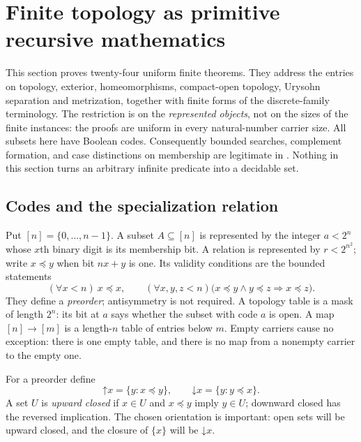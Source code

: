 \section{Finite topology as primitive recursive mathematics}\label{sec:finite}

This section proves twenty-four uniform finite theorems.  They address the
entries on topology, exterior, homeomorphisms, compact-open topology,
Urysohn separation and metrization, together with finite forms of the
discrete-family terminology.  The restriction is on the \emph{represented
objects}, not on the sizes of the finite instances: the proofs are uniform
in every natural-number carrier size.  All subsets here have Boolean
codes.  Consequently bounded searches, complement formation, and
case distinctions on membership are legitimate in \ipra.  Nothing in
this section turns an arbitrary infinite predicate into a decidable set.

\subsection{Codes and the specialization relation}

Put $[n]=\{0,\ldots,n-1\}$.  A subset $A\subseteq[n]$ is represented by
the integer $a<2^n$ whose $x$th binary digit is its membership bit.  A
relation is represented by $r<2^{n^2}$; write $x\preceq y$ when bit
$nx+y$ is one.  Its validity conditions are the bounded statements
\[
 (\forall x<n)\ x\preceq x,\qquad
 (\forall x,y,z<n)\bigl(x\preceq y\land y\preceq z
                         \Rightarrow x\preceq z\bigr).
\]
They define a \emph{preorder}; antisymmetry is not required.  A topology
table is a mask of length $2^n$: its bit at $a$ says whether the subset
with code $a$ is open.  A map $[n]\to[m]$ is a length-$n$ table of
entries below $m$.  Empty carriers cause no exception: there is one
empty table, and there is no map from a nonempty carrier to the empty
one.

For a preorder define
\[
 \mathord\uparrow x=\{y:x\preceq y\},\qquad
 \mathord\downarrow x=\{y:y\preceq x\}.
\]
A set $U$ is \emph{upward closed} if $x\in U$ and $x\preceq y$ imply
$y\in U$; downward closed has the reversed implication.  The chosen
orientation is important: open sets will be upward closed, and the
closure of $\{x\}$ will be $\mathord\downarrow x$.

